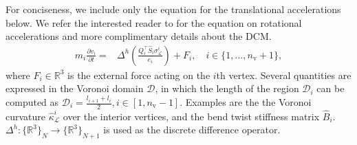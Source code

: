 For conciseness, we include only the equation for the translational accelerations below. We refer the interested reader to \citep{gazzola2018forward} for the equation on rotational accelerations and more complimentary details about the \gls{DCM}.
\begin{align}
    m_i \frac{\partial v_i}{\partial t} =& \Delta^h \left ( \frac{Q_i^\top \hat{S}_i \sigma^i_{\mathcal{L}}}{e_i} \right ) + F_i, \quad i\in \{1,\dots,n_\mathrm{v}+1\},
\end{align}
where $F_i \in \mathbb{R}^3$ is the external force acting on the $i$th vertex.
Several quantities are expressed in the Voronoi domain $\mathcal{D}$, in which the length of the region $\mathcal{D}_i$ can be computed as $\mathcal{D}_i = \frac{l_{i+1} + l_i}{2}, i \in [1,n_\mathrm{v}-1]$. Examples are the %
the Voronoi curvature $\hat{\kappa}_{\mathcal{L}}^i$ over the interior vertices, and the bend twist stiffness matrix $\hat{B}_i$.
$\Delta^h : \{\mathbb{R}^3 \}_N \rightarrow \{ \mathbb{R}^3 \}_{N+1}$ is used as the discrete difference operator.

